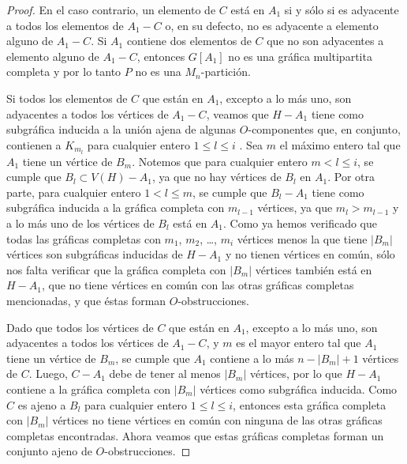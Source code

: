 \begin{proof}
En el caso contrario, un elemento de $C$ está en $A_1$ si y sólo si es adyacente a todos los elementos de $A_1-C$ o, en su defecto, no es adyacente a elemento alguno de $A_1-C$. Si $A_1$ contiene dos elementos de $C$ que no son adyacentes a elemento alguno de $A_1-C$, entonces $G[A_1]$ no es una gráfica multipartita completa y por lo tanto $P$ no es una $M_n$-partición.

Si todos los elementos de $C$ que están en $A_1$, excepto a lo más uno, son adyacentes a todos los vértices de $A_1-C$, veamos que $H-A_1$ tiene como subgráfica inducida a la unión ajena de algunas $O$-componentes que, en conjunto, contienen a $K_{m_l}$ para cualquier entero $1\le l\le i$ . Sea $m$ el máximo entero tal que $A_1$ tiene un vértice de $B_m$. Notemos que para cualquier entero $m < l \le i$, se cumple que $B_{l}\subset V(H)-A_1$, ya que no hay vértices de $B_l$ en $A_1$. Por otra parte, para cualquier entero $1 < l \le m$, se cumple que $B_{l}-A_1$ tiene como subgráfica inducida a la gráfica completa con $m_{l-1}$ vértices, ya que $m_l>m_{l-1}$ y a lo más uno de los vértices de $B_l$ está en $A_1$. Como ya hemos verificado que todas las gráficas completas con $m_1$, $m_2$, \dots, $m_i$ vértices menos la que tiene $|B_m|$ vértices son subgráficas inducidas de $H-A_1$ y no tienen vértices en común, sólo nos falta verificar que la gráfica completa con $|B_m|$ vértices también está en $H-A_1$, que no tiene vértices en común con las otras gráficas completas mencionadas, y que éstas forman $O$-obstrucciones.

Dado que todos los vértices de $C$ que están en $A_1$, excepto a lo más uno, son adyacentes a todos los vértices de $A_1-C$, y $m$ es el mayor entero tal que $A_1$ tiene un vértice de $B_m$, se cumple que $A_1$ contiene a lo más $n-|B_m|+1$ vértices de $C$. Luego, $C-A_1$ debe de tener al menos $|B_m|$ vértices, por lo que $H-A_1$ contiene a la gráfica completa con $|B_m|$ vértices como subgráfica inducida. Como $C$ es ajeno a $B_l$ para cualquier entero $1\le l\le i$, entonces esta gráfica completa con $|B_m|$ vértices no tiene vértices en común con ninguna de las otras gráficas completas encontradas. Ahora veamos que estas gráficas completas forman un conjunto ajeno de $O$-obstrucciones.


\end{proof}
